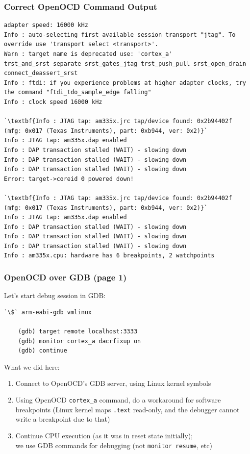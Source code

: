 \begin{frame}[containsverbatim]
  \frametitle{Correct OpenOCD Command Output}
  \vspace*{-5mm}
  \begin{lstlisting}[numbers=none]
adapter speed: 16000 kHz
Info : auto-selecting first available session transport "jtag". To override use 'transport select <transport>'.
Warn : target name is deprecated use: 'cortex_a'
trst_and_srst separate srst_gates_jtag trst_push_pull srst_open_drain connect_deassert_srst
Info : ftdi: if you experience problems at higher adapter clocks, try the command "ftdi_tdo_sample_edge falling"
Info : clock speed 16000 kHz

`\textbf{Info : JTAG tap: am335x.jrc tap/device found: 0x2b94402f (mfg: 0x017 (Texas Instruments), part: 0xb944, ver: 0x2)}`
Info : JTAG tap: am335x.dap enabled
Info : DAP transaction stalled (WAIT) - slowing down
Info : DAP transaction stalled (WAIT) - slowing down
Info : DAP transaction stalled (WAIT) - slowing down
Error: target->coreid 0 powered down!

`\textbf{Info : JTAG tap: am335x.jrc tap/device found: 0x2b94402f (mfg: 0x017 (Texas Instruments), part: 0xb944, ver: 0x2)}`
Info : JTAG tap: am335x.dap enabled
Info : DAP transaction stalled (WAIT) - slowing down
Info : DAP transaction stalled (WAIT) - slowing down
Info : DAP transaction stalled (WAIT) - slowing down
Info : am335x.cpu: hardware has 6 breakpoints, 2 watchpoints
  \end{lstlisting}
  \vspace*{-5mm}
\end{frame}

\begin{frame}[containsverbatim]
  \frametitle{OpenOCD over GDB (page 1)}
  Let's start debug session in GDB:
  \begin{lstlisting}[numbers=none]
    `\$` arm-eabi-gdb vmlinux

    (gdb) target remote localhost:3333
    (gdb) monitor cortex_a dacrfixup on
    (gdb) continue
  \end{lstlisting}
  What we did here:
  \begin{enumerate}
    \item Connect to OpenOCD's GDB server, using Linux kernel symbols
    \item Using OpenOCD \texttt{cortex\_a} command, do a workaround for software
          breakpoints (Linux kernel maps \texttt{.text} read-only, and the
          debugger cannot write a breakpoint due to that)
    \item Continue CPU execution (as it was in reset state initially);\\
          we use GDB commands for debugging (not \texttt{monitor resume}, etc)
  \end{enumerate}
\end{frame}

